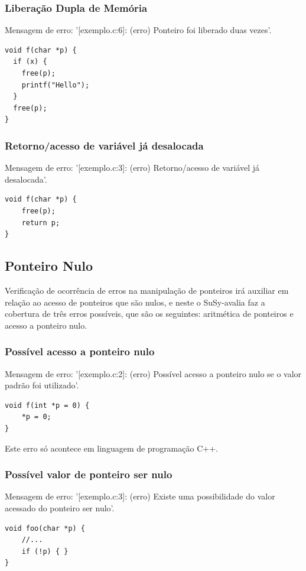 \documentclass[12pt,a4paper]{report}
\begin{document}
\subsubsection{Liberação Dupla de Memória}
Mensagem de erro: '[exemplo.c:6]: (erro) Ponteiro foi liberado duas vezes'.
\begin{lstlisting}[style=CStyle]
void f(char *p) {
  if (x) {
    free(p);
    printf("Hello");
  }
  free(p);
}
\end{lstlisting}

\subsubsection{Retorno/acesso de variável já desalocada}
Mensagem de erro: '[exemplo.c:3]: (erro) Retorno/acesso de variável já desalocada'.
\begin{lstlisting}[style=CStyle]
void f(char *p) {
    free(p);
    return p;
}
\end{lstlisting}

\subsection{Ponteiro Nulo}
Verificação de ocorrência de erros na manipulação de ponteiros irá auxiliar em relação ao acesso de ponteiros que são nulos, e neste o SuSy-avalia faz a cobertura de três erros possíveis, que são os seguintes: aritmética de ponteiros e acesso a ponteiro nulo.

\subsubsection{Possível acesso a ponteiro nulo}
Mensagem de erro: '[exemplo.c:2]: (erro) Possível acesso a ponteiro nulo se o valor padrão foi utilizado'.
\begin{lstlisting}[style=CStyle]
void f(int *p = 0) {
    *p = 0;
}
\end{lstlisting}
Este erro só acontece em linguagem de programação C++.

\subsubsection{Possível valor de ponteiro ser nulo}
Mensagem de erro: '[exemplo.c:3]: (erro) Existe uma possibilidade do valor acessado do ponteiro ser nulo'.
\begin{lstlisting}[style=CStyle]
void foo(char *p) {
    //...
    if (!p) { }
}
\end{lstlisting}
\end{document}
